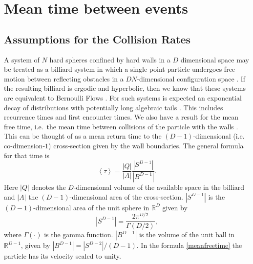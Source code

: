 \documentclass[a4paper,10pt, jcp, aps, preprint]{revtex4-1}
\newcommand{\mean}[1]{\left \langle #1 \right \rangle}
\newcommand{\RR}{\mathbb{R}}
\begin{document}


\section{Mean time between events}


\subsection{Assumptions for the Collision Rates}

A system of $N$ hard spheres confined by hard walls in a $D$ dimensional
space may be treated as a billiard system 
in which a single point  particle undergoes free motion between reflecting obstacles 
in a $ D N $-dimensional configuration space \cite{Sinai70, MarkChern}. 
If the resulting billiard is ergodic and hyperbolic, then we know that
these systems are equivalent to Bernoulli Flows \cite{Gallavotti74}.
For such systems is expected an exponential decay of 
distributions \cite{AbadiGalves} with potentially
long algebraic tails \cite{ZasTip}. 
This includes recurrence times and
first encounter times. We also
have a result for the mean free time, i.e.\ the mean time between 
collisions of the particle with the walls \cite{MarkChern}. 
This can be thought of as a mean return time to the $(D-1)$-dimensional 
(i.e. co-dimension-$1$) cross-section given by the wall boundaries.
The general formula for that time is
\begin{equation}\label{meanfreetime}
 \mean{\tau} = \frac{|Q|}{|A|} \frac{|S^{D-1}|}{|B^{D-1}|}.
\end{equation}
Here $|Q|$ denotes the $D$-dimensional volume of the available 
space in the billiard and 
$|A|$ the $(D-1)$-dimensional area of the cross-section.
 $|S^{D-1}|$ is the $(D-1)$-dimensional area of the unit sphere in $\RR^D$ given by
\begin{equation}
  |S^{D-1}| = \frac{2 \pi^{D/2}}{\Gamma(D/2)},
\end{equation}
where $\Gamma(\cdot)$ is the gamma function. 
$|B^{D-1}|$ is the volume of the unit ball 
in $\RR^{D-1}$, given by $|B^{D-1}| = |S^{D-2}| / (D-1)$.
In the formula \ref{meanfreetime}  the particle has 
its velocity scaled to unity.
\end{document}
